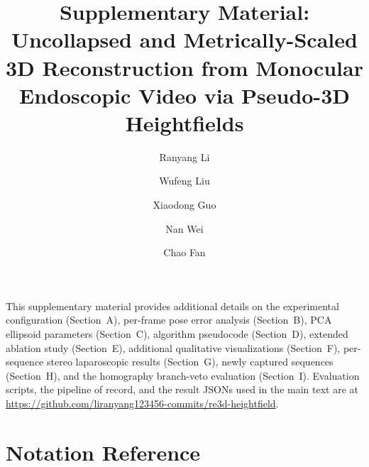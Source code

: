 \documentclass[review]{elsarticle}
\begin{document}
\begin{frontmatter}

\title{Supplementary Material:\\
Uncollapsed and Metrically-Scaled 3D Reconstruction from Monocular Endoscopic Video via Pseudo-3D Heightfields}

\author[1]{Ranyang Li}
\author[1]{Wufeng Liu}
\author[1]{Xiaodong Guo}
\author[2]{Nan Wei}
\author[1]{Chao Fan}
\address[1]{School of Artificial Intelligence and Big Data, Henan University of Technology, Zhengzhou 450001, China}
\address[2]{Henan Provincial People's Hospital, Zhengzhou University, Zhengzhou 450003, China}

\end{frontmatter}

This supplementary material provides additional details on the experimental configuration (Section~A), per-frame pose error analysis (Section~B), PCA ellipsoid parameters (Section~C), algorithm pseudocode (Section~D), extended ablation study (Section~E), additional qualitative visualizations (Section~F), per-sequence stereo laparoscopic results (Section~G), newly captured sequences (Section~H), and the homography branch-veto evaluation (Section~I). Evaluation scripts, the pipeline of record, and the result JSONs used in the main text are at \url{https://github.com/liranyang123456-commits/re3d-heightfield}.

\section*{Notation Reference}
\end{document}
